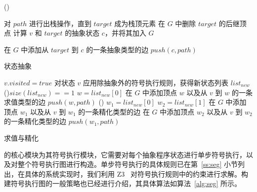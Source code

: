 \begin{algorithm}[htbp]
   \Else() { 
    对 $path$ 进行出栈操作，直到 $target$ 成为栈顶元素\;
    在 $G$ 中删除 $target$ 的后继顶点\;
    计算 $v$ 和 $target$ 的抽象状态 $c$，并将其加入 $G$\;

     {
      在 $G$ 中添加从 $target$ 到 $c$ 的一条抽象类型的边\;
      $push(c,path)$\;
    } 
  }
\caption{状态抽象}
\label{alg:abstraction}
\end{algorithm}

\begin{algorithm}[htbp]
  $v.visited = true$\;
  对状态 $v$ 应用除抽象外的符号执行规则，获得新状态列表 $list_{new}$\;
  \uIf(){$size(list_{new}) == 1$ } {
    $w = list_{new}[0]$\;
    在 $G$ 中添加顶点 $w$ 以及从 $v$ 到 $w$ 的一条求值类型的边\;
    $push(w,path)$\;
  } \Else() {
    $w_1 = list_{new}[0]$\;
    $w_2 = list_{new}[1]$\;
    在 $G$ 中添加顶点 $w_1$ 以及从 $v$ 到 $w_1$ 的一条精化类型的边\;
    在 $G$ 中添加顶点 $w_2$ 以及从 $v$ 到 $w_2$ 的一条精化类型的边\;
    $push(w_1,path)$\;
  }
\caption{求值与精化}
\label{alg:evaluation}
\end{algorithm}

\CTerm 的核心模块为其符号执行模块，它需要对每个抽象程序状态进行单步符号执行，以及对整个符号执行图进行构造。单步符号执行的具体规则已在第~\ref{ss:seg} 小节列出，在具体的系统实现时，我们利用 Z3~\cite{DBLP:conf/tacas/MouraB08} 对符号执行规则中的约束进行求解。构建符号执行图的一般策略也已经进行介绍，其具体算法如算法~\ref{alg:seg} 所示。

